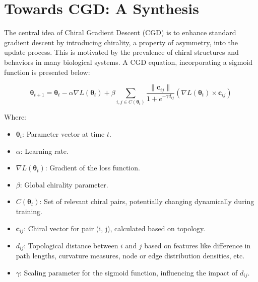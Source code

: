 \documentclass[12pt, a4paper]{article}
\begin{document}
\section{Towards CGD: A Synthesis}

The central idea of Chiral Gradient Descent (CGD) is to enhance standard gradient descent by introducing chirality, a property of asymmetry, into the update process.  This is motivated by the prevalence of chiral structures and behaviors in many biological systems.  A CGD equation, incorporating a sigmoid function is presented below:

\begin{equation} \label{eq:cgd_sigmoid_final}
\boldsymbol{\theta}_{t+1} = \boldsymbol{\theta}_t - \alpha \nabla L(\boldsymbol{\theta}_t) + \beta \sum_{i,j \in C(\boldsymbol{\theta}_t)}  \frac{\| \mathbf{c}_{ij} \|}{1 + e^{-\gamma d_{ij}}} (\nabla L(\boldsymbol{\theta}_t) \times \mathbf{c}_{ij})
\end{equation}

Where:

\begin{itemize}
    \item \(\boldsymbol{\theta}_t\): Parameter vector at time \(t\).
    \item \(\alpha\): Learning rate.
    \item \(\nabla L(\boldsymbol{\theta}_t)\): Gradient of the loss function.
    \item \(\beta\): Global chirality parameter.
    \item \(C(\boldsymbol{\theta}_t)\): Set of relevant chiral pairs, potentially changing dynamically during training.
    \item \(\mathbf{c}_{ij}\): Chiral vector for pair (i, j), calculated based on topology.
    \item \(d_{ij}\): Topological distance between \(i\) and \(j\) based on features like difference in path lengths, curvature measures, node or edge distribution densities, etc.
    \item \(\gamma\): Scaling parameter for the sigmoid function, influencing the impact of \(d_{ij}\).
\end{itemize}
\end{document}
